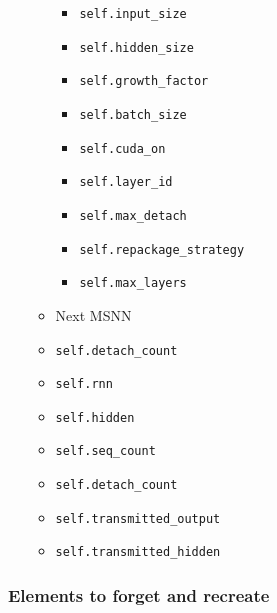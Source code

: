 \begin{itemize}
\begin{itemize}
    \begin{itemize}
    \item
      \lstinline!self.input_size!
    \item
      \lstinline!self.hidden_size!
    \item
      \lstinline!self.growth_factor!
    \item
      \lstinline!self.batch_size!
    \item
      \lstinline!self.cuda_on!
    \item
      \lstinline!self.layer_id!
    \item
      \lstinline!self.max_detach!
    \item
      \lstinline!self.repackage_strategy!
    \item
      \lstinline!self.max_layers!
    \end{itemize}
  \item
    Next MSNN
  \item
    \lstinline!self.detach_count!
  \item
    \lstinline!self.rnn!
  \item
    \lstinline!self.hidden!
  \item
    \lstinline!self.seq_count!
  \item
    \lstinline!self.detach_count!
  \item
    \lstinline!self.transmitted_output!
  \item
    \lstinline!self.transmitted_hidden!
  \end{itemize}
\end{itemize}

\subsubsection{Elements to forget and
recreate}


